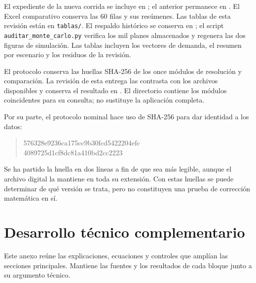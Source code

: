 \documentclass[12pt,a4paper,oneside]{article}
\begin{document}
El expediente de la nueva corrida se incluye en ; el anterior permanece en . El Excel comparativo conserva las 60 filas y sus resúmenes. Las tablas de esta revisión están en \texttt{tablas/}. El respaldo histórico se conserva en ; el script \texttt{auditar\_monte\_carlo.py} verifica los mil planes almacenados y regenera las dos figuras de simulación. Las tablas incluyen los vectores de demanda, el resumen por escenario y los residuos de la revisión.

El protocolo conserva las huellas SHA-256 de los once módulos de resolución y comparación. La revisión de esta entrega las contrasta con los archivos disponibles y conserva el resultado en . El directorio  contiene los módulos coincidentes para su consulta; no sustituye la aplicación completa.

Por su parte, el protocolo nominal hace uso de SHA-256 para dar identidad a los datos:
\begin{quote}\small\ttfamily
	576328e9236ca175cc9b30fcd5422204efc\\4089725d1cf8dc81a410bd2cc2223
\end{quote}
Se ha partido la huella en dos líneas a fin de que sea más legible, aunque el archivo digital la mantiene en toda su extensión. Con estas huellas se puede determinar de qué versión se trata, pero no constituyen una prueba de corrección matemática en sí.



\clearpage
\section{Desarrollo técnico complementario}\label{an:desarrollo_complementario}
Este anexo reúne las explicaciones, ecuaciones y controles que amplían las secciones principales. Mantiene las fuentes y los resultados de cada bloque junto a su argumento técnico.






\end{document}
